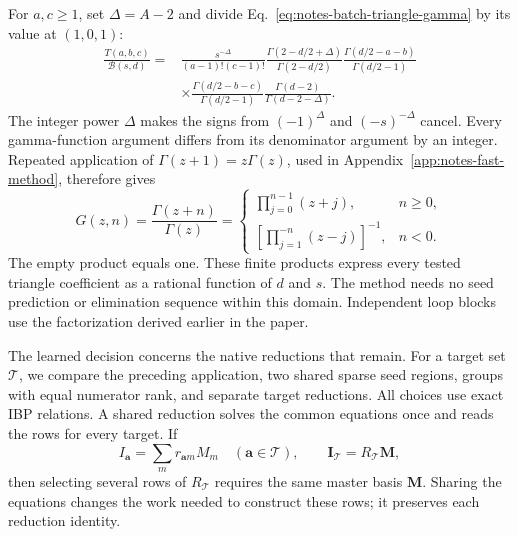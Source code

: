 For \(a,c\ge1\), set \(\Delta=A-2\) and divide Eq.~\eqref{eq:notes-batch-triangle-gamma} by its value at \((1,0,1)\):
\begin{align}
 \frac{T(a,b,c)}{\mathcal B(s,d)}
 ={}&
 \frac{s^{-\Delta}}{(a-1)!(c-1)!}
 \frac{\Gamma(2-d/2+\Delta)}{\Gamma(2-d/2)}
 \frac{\Gamma(d/2-a-b)}{\Gamma(d/2-1)}
 \nonumber\\
 &\times
 \frac{\Gamma(d/2-b-c)}{\Gamma(d/2-1)}
 \frac{\Gamma(d-2)}{\Gamma(d-2-\Delta)}.
 \label{eq:notes-batch-triangle-ratio}
\end{align}
The integer power \(\Delta\) makes the signs from \((-1)^\Delta\) and \((-s)^{-\Delta}\) cancel. Every gamma-function argument differs from its denominator argument by an integer. Repeated application of \(\Gamma(z+1)=z\Gamma(z)\), used in Appendix~\ref{app:notes-fast-method}, therefore gives
\begin{equation}
 G(z,n)=\frac{\Gamma(z+n)}{\Gamma(z)}
 =
 \begin{cases}
 \displaystyle\prod_{j=0}^{n-1}(z+j),&n\ge0,\\[4pt]
 \displaystyle\left[\prod_{j=1}^{-n}(z-j)\right]^{-1},&n<0 .
 \end{cases}
 \label{eq:notes-batch-gamma-shift}
\end{equation}
The empty product equals one. These finite products express every tested triangle coefficient as a rational function of \(d\) and \(s\). The method needs no seed prediction or elimination sequence within this domain. Independent loop blocks use the factorization derived earlier in the paper.

The learned decision concerns the native reductions that remain. For a target set \(\mathcal T\), we compare the preceding application, two shared sparse seed regions, groups with equal numerator rank, and separate target reductions. All choices use exact IBP relations. A shared reduction solves the common equations once and reads the rows for every target. If
\begin{equation}
 I_{\mathbf a}=\sum_m r_{\mathbf a m}M_m
 \quad(\mathbf a\in\mathcal T),
 \qquad
 \mathbf I_{\mathcal T}=R_{\mathcal T}\mathbf M,
 \label{eq:notes-batch-shared}
\end{equation}
then selecting several rows of \(R_{\mathcal T}\) requires the same master basis \(\mathbf M\). Sharing the equations changes the work needed to construct these rows; it preserves each reduction identity.

